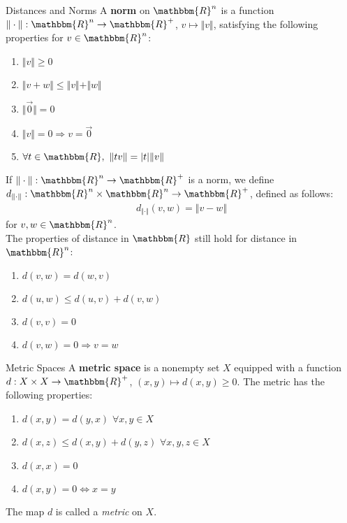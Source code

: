 \documentclass[10pt]{extarticle}
\newcommand{\R}{\mathbbm{R}}
\begin{document}
  \begin{problem}{Distances and Norms}
    A \textbf{norm} on $\R^n$ is a function $\Vert \cdot \Vert: \R^n \rightarrow \R^+$, $v\mapsto \Vert v \Vert$, satisfying the following properties for $v\in\R^n$:
    \begin{enumerate}[(1)]
      \item $\Vert v \Vert \geq 0$
      \item $\Vert v + w \Vert \leq \Vert v \Vert + \Vert w \Vert$
      \item $\Vert \vec{0}\Vert = 0$
      \item $\Vert v \Vert = 0\Rightarrow v = \vec{0}$
      \item $\forall t\in\R,~\Vert tv \Vert = |t|\Vert v\Vert$
    \end{enumerate}
    If $\Vert \cdot \Vert: \R^n \rightarrow \R^+$ is a norm, we define $d_{\Vert \cdot \Vert}: \R^n \times \R^n \rightarrow \R^+$, defined as follows:
    \begin{align*}
      d_{\Vert \cdot \Vert}(v,w) = \Vert v-w \Vert
    \end{align*}
    for $v,w\in\R^n$.\\

    The properties of distance in $\R$ still hold for distance in $\R^n$:
    \begin{enumerate}[(1)]
      \item $d(v,w) = d(w,v)$
      \item $d(u,w) \leq d(u,v) + d(v,w)$
      \item $d(v,v) = 0$
      \item $d(v,w) = 0 \Rightarrow v=w$
    \end{enumerate}
  \end{problem}
  \begin{problem}{Metric Spaces}
    A \textbf{metric space} is a nonempty set $X$ equipped with a function $d: X\times X \rightarrow \R^+$, $(x,y)\mapsto d(x,y) \geq 0$. The metric has the following properties:
    \begin{enumerate}[(1)]
      \item $d(x,y) = d(y,x)$ $\forall x,y\in X$
      \item $d(x,z) \leq d(x,y) + d(y,z)$ $\forall x,y,z\in X$
      \item $d(x,x) = 0$
      \item $d(x,y) = 0 \Leftrightarrow x=y$
    \end{enumerate}
    The map $d$ is called a \textsl{metric} on $X$.
  \end{problem}
\end{document}
